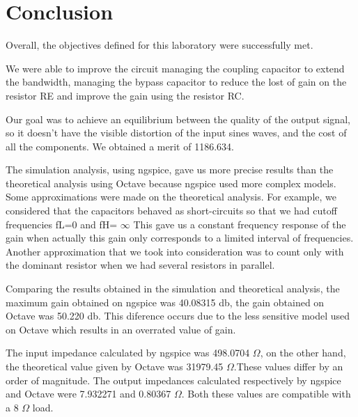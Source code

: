 \section{Conclusion}
\label{sec:conclusion}


Overall, the objectives defined for this laboratory were successfully met.

We were able to improve the circuit managing the coupling capacitor to extend the bandwidth, managing the bypass capacitor to reduce the lost of gain on the resistor RE and improve the gain using the resistor RC.


Our goal was to achieve an equilibrium between the quality of the output signal, so it doesn't have the visible distortion of the input sines waves, and the cost of all the components. We obtained a merit of 1186.634.

The simulation analysis, using ngspice, gave us more precise results than the theoretical analysis using Octave because ngspice used more complex models. Some approximations were made on the theoretical analysis. For example, we considered that the capacitors behaved as short-circuits so that we had cutoff frequencies fL=0 and fH= $\infty$ This gave us a constant frequency response of the gain when actually this gain only corresponds to a limited interval of frequencies.  Another approximation that we took into consideration was to count only with the dominant resistor when we had several resistors in parallel.  

Comparing the results obtained in the simulation and theoretical analysis, the maximum gain obtained on ngspice was 40.08315 db, the gain obtained on Octave was 50.220 db. This diference occurs due to the less sensitive model used on Octave which results in an overrated value of gain. 

The input impedance calculated by ngspice was 498.0704 $\Omega$, on the other hand, the theoretical value  given by Octave was 31979.45 $\Omega$.These values differ by an order of magnitude. The output impedances calculated respectively by ngspice and Octave were 7.932271 and 0.80367 $\Omega$. Both these values are compatible with a 8 $\Omega$ load. 






